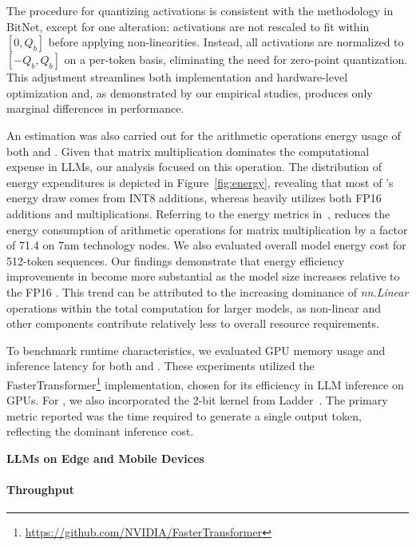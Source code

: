 The procedure for quantizing activations is consistent with the methodology in BitNet, except for one alteration: activations are not rescaled to fit within $[0, Q_b]$ before applying non-linearities. Instead, all activations are normalized to $[-Q_b, Q_b]$ on a per-token basis, eliminating the need for zero-point quantization. This adjustment streamlines both implementation and hardware-level optimization and, as demonstrated by our empirical studies, produces only marginal differences in performance.

An estimation was also carried out for the arithmetic operations energy usage of both  and . Given that matrix multiplication dominates the computational expense in LLMs, our analysis focused on this operation. The distribution of energy expenditures is depicted in Figure~\ref{fig:energy}, revealing that most of 's energy draw comes from INT8 additions, whereas  heavily utilizes both FP16 additions and multiplications. Referring to the energy metrics in~\cite{energycost, pokebnn},  reduces the energy consumption of arithmetic operations for matrix multiplication by a factor of 71.4 on 7nm technology nodes. We also evaluated overall model energy cost for 512-token sequences. Our findings demonstrate that energy efficiency improvements in  become more substantial as the model size increases relative to the FP16 . This trend can be attributed to the increasing dominance of \emph{nn.Linear} operations within the total computation for larger models, as non-linear and other components contribute relatively less to overall resource requirements.

To benchmark runtime characteristics, we evaluated GPU memory usage and inference latency for both  and . These experiments utilized the FasterTransformer\footnote{\url{https://github.com/NVIDIA/FasterTransformer}} implementation, chosen for its efficiency in LLM inference on GPUs. For , we also incorporated the 2-bit kernel from Ladder~\cite{ladder}. The primary metric reported was the time required to generate a single output token, reflecting the dominant inference cost.

\textbf{LLMs on Edge and Mobile Devices}

\paragraph{Throughput}

